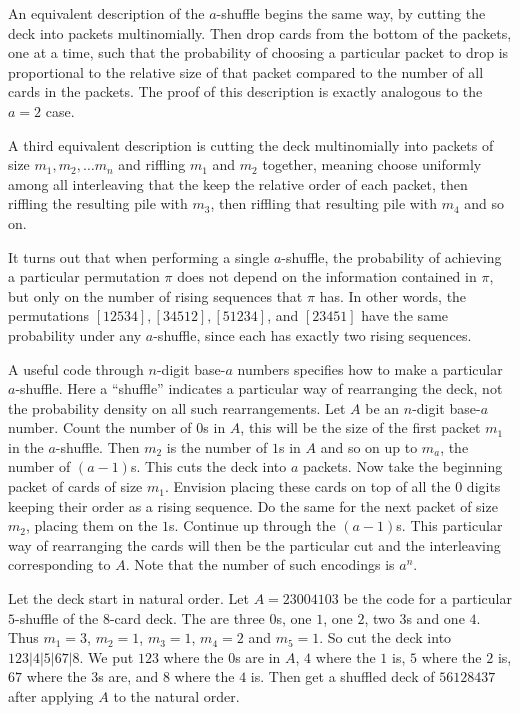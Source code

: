 \documentclass[12pt]{article}
\begin{document}
An equivalent description of the \( a \)-shuffle begins the same way, by
cutting the deck into packets multinomially.  Then drop cards from the
bottom of the packets, one at a time, such that the probability of
choosing a particular packet to drop is proportional to the relative
size of that packet compared to the number of all cards in the packets.
The proof of this description is exactly analogous to the \( a = 2 \)
case.

A third equivalent description is cutting the deck multinomially into
packets of size \( m_1, m_2, \dots m_n \) and riffling \( m_1 \) and \(
m_2 \) together, meaning choose uniformly among all interleaving that
the keep the relative order of each packet, then riffling the resulting
pile with \( m_3 \), then riffling that resulting pile with \( m_4 \)
and so on.

It turns out that when performing a single \( a \)-shuffle, the
probability of achieving a particular permutation \( \pi \) does not
depend on the information contained in \( \pi \), but only on the number
of rising sequences that \( \pi \) has.  In other words, the
permutations \( [12534], [34512], [51234] \), and \( [23451] \) have the
same probability under any \( a \)-shuffle, since each has exactly two
rising sequences.

A useful code through \( n \)-digit base-\( a \) numbers specifies how
to make a particular \( a \)-shuffle.  Here a ``shuffle'' indicates a
particular way of rearranging the deck, not the probability density on
all such rearrangements.  Let \( A \) be an \( n \)-digit base-\( a \)
number.  Count the number of \( 0 \)s in \( A \), this will be the size
of the first packet \( m_1 \) in the \( a \)-shuffle.  Then \( m_2 \) is
the number of \( 1 \)s in \( A \) and so on up to \( m_a \), the number
of \( (a-1) \)s.  This cuts the deck into \( a \) packets.  Now take the
beginning packet of cards of size \( m_1 \).  Envision placing these
cards on top of all the \( 0 \) digits keeping their order as a rising
sequence.  Do the same for the next packet of size \( m_2 \), placing
them on the \( 1 \)s.  Continue up through the \( (a-1) \)s.  This
particular way of rearranging the cards will then be the particular cut
and the interleaving corresponding to \( A \).  Note that the number of
such encodings is \( a^n \).

\begin{example}
    Let the deck start in natural order.  Let \( A = 23004103 \) be the
    code for a particular \( 5 \)-shuffle of the \( 8 \)-card deck.  The
    are three \( 0 \)s, one \( 1 \), one \( 2 \), two \( 3 \)s and one \(
    4 \).  Thus \( m_1 = 3 \), \( m_2 = 1 \), \( m_3 =1 \), \( m_4 = 2 \)
    and \( m_5 = 1 \).  So cut the deck into \( 123|4|5|67|8 \).  We put
    \( 123 \) where the \( 0 \)s are in \( A \), \( 4 \) where the \( 1 \)
    is, \( 5 \) where the \( 2 \) is, \( 67 \) where the \( 3 \)s are,
    and \( 8 \) where the \( 4 \) is.  Then get a shuffled deck of \(
    56128437 \) after applying \( A \) to the natural order.
\end{example}
\end{document}
